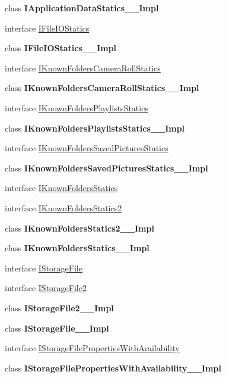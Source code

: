 \begin{DoxyCompactItemize}
\item 
class {\bfseries I\+Application\+Data\+Statics\+\_\+\+\_\+\+Impl}
\item 
interface \hyperlink{interface_windows_1_1_storage_1_1_i_file_i_o_statics}{I\+File\+I\+O\+Statics}
\item 
class {\bfseries I\+File\+I\+O\+Statics\+\_\+\+\_\+\+Impl}
\item 
interface \hyperlink{interface_windows_1_1_storage_1_1_i_known_folders_camera_roll_statics}{I\+Known\+Folders\+Camera\+Roll\+Statics}
\item 
class {\bfseries I\+Known\+Folders\+Camera\+Roll\+Statics\+\_\+\+\_\+\+Impl}
\item 
interface \hyperlink{interface_windows_1_1_storage_1_1_i_known_folders_playlists_statics}{I\+Known\+Folders\+Playlists\+Statics}
\item 
class {\bfseries I\+Known\+Folders\+Playlists\+Statics\+\_\+\+\_\+\+Impl}
\item 
interface \hyperlink{interface_windows_1_1_storage_1_1_i_known_folders_saved_pictures_statics}{I\+Known\+Folders\+Saved\+Pictures\+Statics}
\item 
class {\bfseries I\+Known\+Folders\+Saved\+Pictures\+Statics\+\_\+\+\_\+\+Impl}
\item 
interface \hyperlink{interface_windows_1_1_storage_1_1_i_known_folders_statics}{I\+Known\+Folders\+Statics}
\item 
interface \hyperlink{interface_windows_1_1_storage_1_1_i_known_folders_statics2}{I\+Known\+Folders\+Statics2}
\item 
class {\bfseries I\+Known\+Folders\+Statics2\+\_\+\+\_\+\+Impl}
\item 
class {\bfseries I\+Known\+Folders\+Statics\+\_\+\+\_\+\+Impl}
\item 
interface \hyperlink{interface_windows_1_1_storage_1_1_i_storage_file}{I\+Storage\+File}
\item 
interface \hyperlink{interface_windows_1_1_storage_1_1_i_storage_file2}{I\+Storage\+File2}
\item 
class {\bfseries I\+Storage\+File2\+\_\+\+\_\+\+Impl}
\item 
class {\bfseries I\+Storage\+File\+\_\+\+\_\+\+Impl}
\item 
interface \hyperlink{interface_windows_1_1_storage_1_1_i_storage_file_properties_with_availability}{I\+Storage\+File\+Properties\+With\+Availability}
\item 
class {\bfseries I\+Storage\+File\+Properties\+With\+Availability\+\_\+\+\_\+\+Impl}

\end{DoxyCompactItemize}
